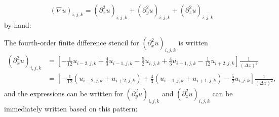 \documentclass[landscape,letterpaper,10pt,english]{article}
\begin{document}
\[
(\nabla u)_{i,j,k} = (\partial_x^2 u)_{i,j,k} + (\partial_y^2 u)_{i,j,k} + (\partial_z^2 u)_{i,j,k}
\] by hand:

The fourth-order finite difference stencil for
\((\partial_x^2 u)_{i,j,k}\) is written \begin{align}
(\partial_x^2 u)_{i,j,k} &= \left[-\frac{1}{12} u_{i-2,j,k} + \frac{4}{3} u_{i-1,j,k} - \frac{5}{2} u_{i,j,k} + \frac{4}{3} u_{i+1,j,k} - \frac{1}{12} u_{i+2,j,k}\right]\frac{1}{(\Delta x)^2} \\
&= \left[-\frac{1}{12} \left(u_{i-2,j,k} + u_{i+2,j,k}\right) + \frac{4}{3} \left(u_{i-1,j,k}+u_{i+1,j,k}\right) - \frac{5}{2} u_{i,j,k}\right]\frac{1}{(\Delta x)^2},
\end{align} and the expressions can be written for
\((\partial_y^2 u)_{i,j,k}\) and \((\partial_z^2 u)_{i,j,k}\) can be
immediately written based on this pattern:
\end{document}
